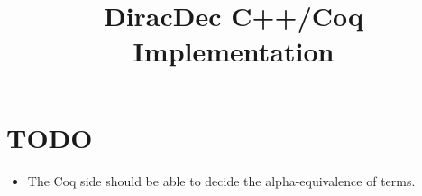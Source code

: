 \documentclass{article}
\title{\textbf{DiracDec C++/Coq Implementation\cite{ExampleCitation}}}
\begin{document}
\maketitle


\newcommand{\reduce}{\triangleright}

\newcommand{\Sort}{\mathsf{Sort}}
\newcommand{\WF}{\mathcal{WF}}

\newcommand{\Type}{\mathsf{Type}}
\newcommand{\BaseS}{\mathsf{Base}}

\newcommand{\SType}{\mathcal{S}}
\newcommand{\KType}{\mathcal{K}}
\newcommand{\BType}{\mathcal{B}}
\newcommand{\OType}{\mathcal{O}}
\newcommand{\SET}{\mathsf{Set}}

\newcommand{\ZEROK}{\mathbf{0}_\mathcal{K}}
\newcommand{\ZEROB}{\mathbf{0}_\mathcal{B}}
\newcommand{\ZEROO}{\mathbf{0}_\mathcal{O}}

\newcommand{\PAIR}{\mathsf{PAIR}}

\newcommand{\ZERO}{\mathsf{0}}
\newcommand{\ONE}{\mathsf{1}}
\newcommand{\ADDS}{\mathsf{ADDS}}
\newcommand{\ADD}{\mathsf{ADD}}
\newcommand{\MULS}{\mathsf{MULS}}
\newcommand{\MUL}{\mathsf{MUL}}
\newcommand{\CONJ}{\mathsf{CONJ}}
\newcommand{\CJG}{\mathsf{CJG}}
\newcommand{\ADJ}{\mathsf{ADJ}}
\newcommand{\DELTA}{\mathsf{DELTA}}
\newcommand{\DOT}{\mathsf{DOT}}
\newcommand{\SCR}{\mathsf{SCR}}
\newcommand{\TSR}{\mathsf{TSR}}
\newcommand{\KET}{\mathsf{KET}}
\newcommand{\BRA}{\mathsf{BRA}}
\newcommand{\ONEO}{\mathbf{1}_\mathcal{O}}
\newcommand{\OUTER}{\mathsf{OUTER}}
\newcommand{\MULK}{\mathsf{MULK}}
\newcommand{\MULB}{\mathsf{MULB}}
\newcommand{\MULO}{\mathsf{MULO}}


\section{TODO}
\begin{itemize}
    \item The Coq side should be able to decide the alpha-equivalence of terms.
\end{itemize}
\end{document}
